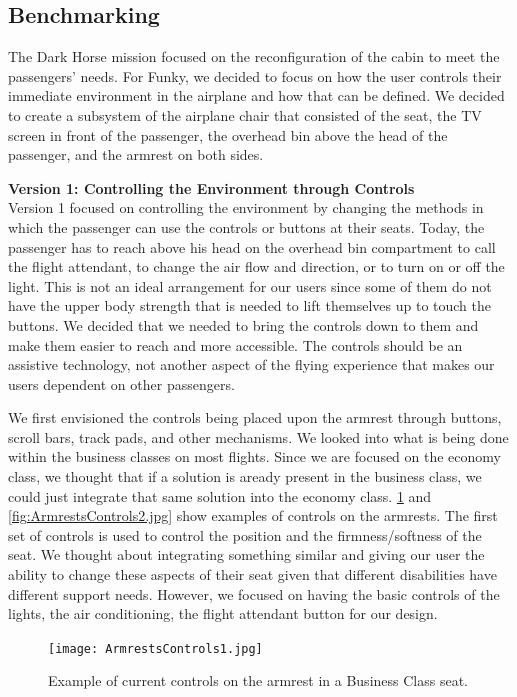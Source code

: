 \subsection{Benchmarking}

The Dark Horse mission focused on the reconfiguration of the cabin to meet the passengers’ needs.  For Funky, we decided to focus on how the user controls their immediate environment in the airplane and how that can be defined.  We decided to create a subsystem of the airplane chair that consisted of the seat, the TV screen in front of the passenger, the overhead bin above the head of the passenger, and the armrest on both sides.

\textbf{Version 1: Controlling the Environment through Controls} \\
Version 1 focused on controlling the environment by changing the methods in which the passenger can use the controls or buttons at their seats.  Today, the passenger has to reach above his head on the overhead bin compartment to call the flight attendant, to change the air flow and direction, or to turn on or off the light.  This is not an ideal arrangement for our users since some of them do not have the upper body strength that is needed to lift themselves up to touch the buttons.  We decided that we needed to bring the controls down to them and make them easier to reach and more accessible.  The controls should be an assistive technology, not another aspect of the flying experience that makes our users dependent on other passengers.   

We first envisioned the controls being placed upon the armrest through buttons, scroll bars, track pads, and other mechanisms. We looked into what is being done within the business classes on most flights.  Since we are focused on the economy class, we thought that if a solution is aready present in the business class, we could just integrate that same solution into the economy class. \ref{fig:ArmrestsControls1.jpg} and \ref{fig:ArmrestsControls2.jpg} show examples of controls on the armrests.  The first set of controls is used to control the position and the firmness/softness of the seat.  We thought about integrating  something similar and giving our user the ability to change these aspects of their seat given that different disabilities have different support needs. However, we focused on having the basic controls of the lights, the air conditioning, the flight attendant button for our design. 

\begin{figure}[h]
  \centering
     \texttt{[image: ArmrestsControls1.jpg]}
   \caption{Example of current controls on the armrest in a Business Class seat. \cite{armrest_control1}}
  \label{fig:ArmrestsControls1.jpg}
\end{figure}

